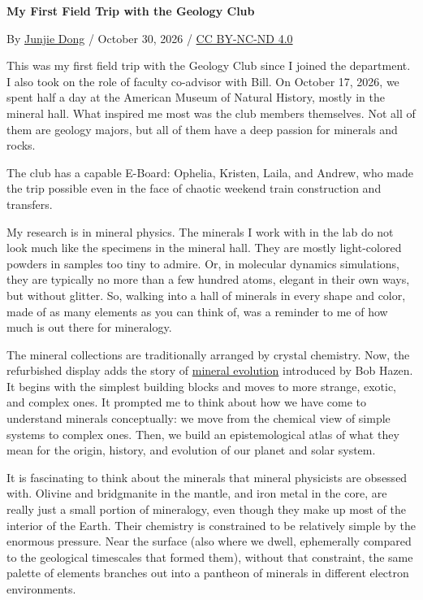 \documentclass[11pt]{article}
\begin{document}
{\LARGE\bfseries My First Field Trip with the Geology Club\par}
\medskip

By \href{https://orcid.org/0000-0003-1114-9348}{Junjie Dong} / October 30, 2026 / \href{https://creativecommons.org/licenses/by-nc-nd/4.0/}{CC BY-NC-ND 4.0}

This was my first field trip with the Geology Club since I joined the department. I also took on the role of faculty co-advisor with Bill. On October 17, 2026, we spent half a day at the American Museum of Natural History, mostly in the mineral hall. What inspired me most was the club members themselves. Not all of them are geology majors, but all of them have a deep passion for minerals and rocks.

The club has a capable E-Board: Ophelia, Kristen, Laila, and Andrew, who made the trip possible even in the face of chaotic weekend train construction and transfers.

My research is in mineral physics. The minerals I work with in the lab do not look much like the specimens in the mineral hall. They are mostly light-colored powders in samples too tiny to admire. Or, in molecular dynamics simulations, they are typically no more than a few hundred atoms, elegant in their own ways, but without glitter. So, walking into a hall of minerals in every shape and color, made of as many elements as you can think of, was a reminder to me of how much is out there for mineralogy.

The mineral collections are traditionally arranged by crystal chemistry. Now, the refurbished display adds the story of \href{https://doi.org/10.2138/am.2008.2955}{mineral evolution} introduced by Bob Hazen. It begins with the simplest building blocks and moves to more strange, exotic, and complex ones. It prompted me to think about how we have come to understand minerals conceptually: we move from the chemical view of simple systems to complex ones. Then, we build an epistemological atlas of what they mean for the origin, history, and evolution of our planet and solar system.

It is fascinating to think about the minerals that mineral physicists are obsessed with. Olivine and bridgmanite in the mantle, and iron metal in the core, are really just a small portion of mineralogy, even though they make up most of the interior of the Earth. Their chemistry is constrained to be relatively simple by the enormous pressure. Near the surface (also where we dwell, ephemerally compared to the geological timescales that formed them), without that constraint, the same palette of elements branches out into a pantheon of minerals in different electron environments.
\end{document}
